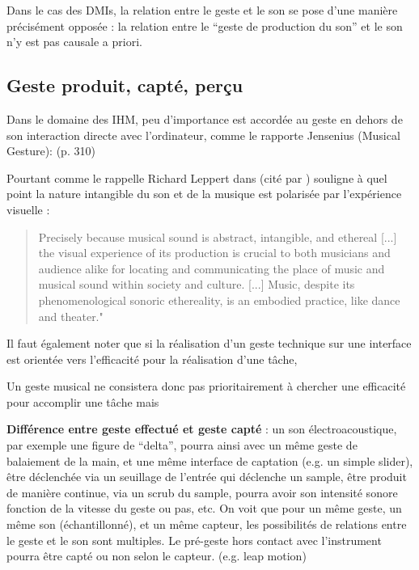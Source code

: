 Dans le cas des \glspl{DMI}, la relation entre le geste et le son se pose d'une manière précisément opposée : la relation entre le ``geste de production du son'' et le son n'y est pas causale a priori.

\subsection{Geste produit, capté, perçu}

Dans le domaine des IHM, peu d'importance est accordée au geste en dehors de son interaction directe avec l'ordinateur, comme le rapporte Jensenius (Musical Gesture):
(p. 310)\cite{kurtenbach_art_1990}

Pourtant comme le rappelle Richard Leppert dans \cite{leppert_sight_1993} (cité par \cite{iazzetta_meaning_2000}) souligne à quel point la nature intangible du son et de la musique est polarisée par l'expérience visuelle :
\begin{quotation}
Precisely because musical sound is abstract, intangible, and ethereal [...] the visual experience of its production is crucial to both musicians and audience alike for locating and communicating the place of music and musical sound within society and culture. [...] Music, despite its phenomenological sonoric ethereality, is an embodied practice, like dance and theater." 
\end{quotation}

Il faut également noter que si la réalisation d'un geste technique sur une interface est orientée vers l'efficacité pour la réalisation d'une tâche, \cite{ryan_remarks_1991}

Un geste musical ne consistera donc pas prioritairement à chercher une efficacité pour accomplir une tâche mais 



\textbf{Différence entre geste effectué et geste capté} : un son électroacoustique, par exemple une figure de ``delta'', pourra ainsi avec un même geste de balaiement de la main, et une même interface de captation (e.g. un simple slider), être déclenchée via un seuillage de l'entrée qui déclenche un sample, être produit de manière continue, via un scrub du sample, pourra avoir son intensité sonore fonction de la vitesse du geste ou pas, etc. On voit que pour un même geste, un même son (échantillonné), et un même capteur, les possibilités de relations entre le geste et le son sont multiples. Le pré-geste hors contact avec l'instrument pourra être capté ou non selon le capteur. (e.g. leap motion)



